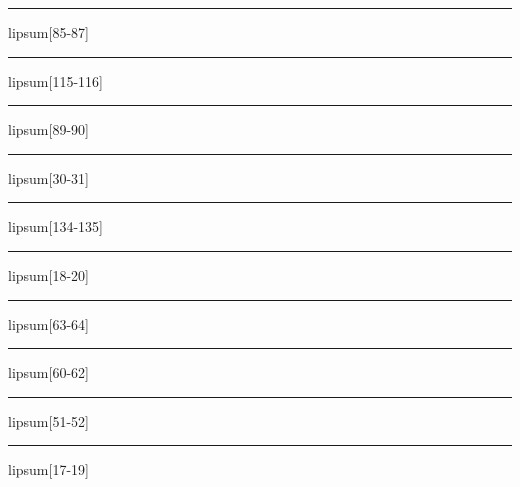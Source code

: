 \documentclass[11pt,a4paper]{article}
\begin{document}
\begin{simplewrap}
  \textcolor{lime!20}{\rule{4.9cm}{2.4cm}}
\end{simplewrap}
lipsum[85-87]

\begin{simplewrap}
  \textcolor{olive!16}{\rule{3.0cm}{4.1cm}}
\end{simplewrap}
lipsum[115-116]

\begin{simplewrap}
  \textcolor{blue!59}{\rule{5.0cm}{7.5cm}}
\end{simplewrap}
lipsum[89-90]

\begin{simplewrap}
  \textcolor{red!16}{\rule{3.9cm}{9.4cm}}
\end{simplewrap}
lipsum[30-31]

\begin{simplewrap}
  \textcolor{purple!32}{\rule{3.9cm}{5.6cm}}
\end{simplewrap}
lipsum[134-135]

\begin{simplewrap}
  \textcolor{red!16}{\rule{4.3cm}{7.6cm}}
\end{simplewrap}
lipsum[18-20]

\begin{simplewrap}
  \textcolor{orange!11}{\rule{5.5cm}{7.2cm}}
\end{simplewrap}
lipsum[63-64]

\begin{simplewrap}
  \textcolor{magenta!20}{\rule{4.0cm}{5.4cm}}
\end{simplewrap}
lipsum[60-62]

\begin{simplewrap}
  \textcolor{cyan!21}{\rule{4.9cm}{5.5cm}}
\end{simplewrap}
lipsum[51-52]

\begin{simplewrap}
  \textcolor{olive!34}{\rule{3.0cm}{3.7cm}}
\end{simplewrap}
lipsum[17-19]
\end{document}
